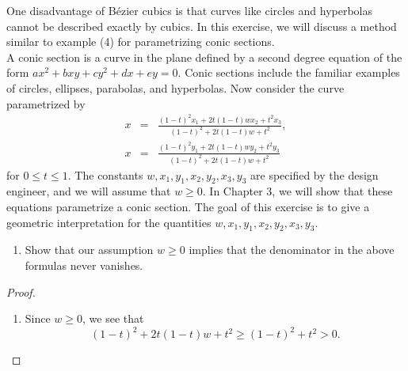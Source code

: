 \begin{exercise}{16}
One disadvantage of B\'ezier cubics is that curves like circles and hyperbolas cannot be described exactly by cubics. In this exercise, we will discuss a method similar to example (4) for parametrizing conic sections.\\

A conic section is a curve in the plane defined by a second degree equation of the form $ax^2 + bxy + cy^2 + dx + ey = 0$. Conic sections include the familiar examples of circles, ellipses, parabolas, and hyperbolas. Now consider the curve parametrized by
\begin{eqnarray*}
    x & = & \frac{(1-t)^2 x_1 + 2t(1-t)wx_2 + t^2 x_3}{(1-t)^2 + 2t(1-t)w + t^2},\\
    x & = & \frac{(1-t)^2 y_1 + 2t(1-t)wy_2 + t^2 y_3}{(1-t)^2 + 2t(1-t)w + t^2}    
\end{eqnarray*}
for $0\leq t\leq 1$. The constants $w,x_1,y_1,x_2,y_2,x_3,y_3$ are specified by the design engineer, and we will assume that $w\geq 0$. In Chapter $3$, we will show that these equations parametrize a conic section. The goal of this exercise is to give a geometric interpretation for the quantities $w,x_1,y_1,x_2,y_2,x_3,y_3$.
    \begin{enumerate}
        \item Show that our assumption $w\geq 0$ implies that the denominator in the above formulas never vanishes.
    \end{enumerate}
\end{exercise}
\begin{proof}
    \begin{enumerate}
        \item Since $w\geq 0$, we see that
        $$(1-t)^2 + 2t(1-t)w + t^2\geq (1-t)^2 + t^2 > 0.$$
    \end{enumerate}
\end{proof}









